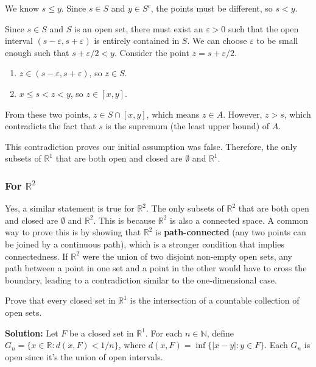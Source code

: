 We know $s \le y$. Since $s \in S$ and $y \in S^c$, the points must be different, so $s < y$.

Since $s \in S$ and $S$ is an open set, there must exist an $\varepsilon > 0$ such that the open interval $(s - \varepsilon, s + \varepsilon)$ is entirely contained in $S$. We can choose $\varepsilon$ to be small enough such that $s + \varepsilon/2 < y$.
Consider the point $z = s + \varepsilon/2$.
\begin{enumerate}
    \item  $z \in (s - \varepsilon, s + \varepsilon)$, so $z \in S$.
    \item  $x \le s < z < y$, so $z \in [x, y]$.
\end{enumerate}
From these two points, $z \in S \cap [x, y]$, which means $z \in A$. However, $z > s$, which contradicts the fact that $s$ is the supremum (the least upper bound) of $A$.

This contradiction proves our initial assumption was false. Therefore, the only subsets of $\mathbb{R}^1$ that are both open and closed are $\emptyset$ and $\mathbb{R}^1$.


\subsubsection*{For $\mathbb{R}^2$}
Yes, a similar statement is true for $\mathbb{R}^2$. The only subsets of $\mathbb{R}^2$ that are both open and closed are $\emptyset$ and $\mathbb{R}^2$. This is because $\mathbb{R}^2$ is also a connected space. A common way to prove this is by showing that $\mathbb{R}^2$ is \textbf{path-connected} (any two points can be joined by a continuous path), which is a stronger condition that implies connectedness. If $\mathbb{R}^2$ were the union of two disjoint non-empty open sets, any path between a point in one set and a point in the other would have to cross the boundary, leading to a contradiction similar to the one-dimensional case.



\begin{problembox}
Prove that every closed set in $\mathbb{R}^1$ is the intersection of a countable collection of open sets.
\end{problembox}

\textbf{Solution:} Let $F$ be a closed set in $\mathbb{R}^1$. For each $n \in \mathbb{N}$, define $G_n = \{x \in \mathbb{R} : d(x,F) < 1/n\}$, where $d(x,F) = \inf\{|x-y| : y \in F\}$. Each $G_n$ is open since it's the union of open intervals.

